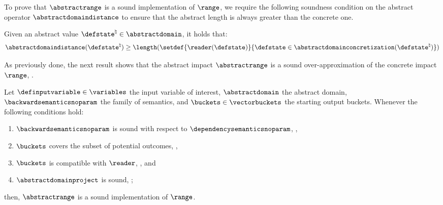 To prove that $\abstractrange$ is a sound implementation of $\range$, we require the following soundness condition on the abstract operator $\abstractdomaindistance$ to ensure that the abstract length is always greater than the concrete one.

\begin{definition}
  Given an abstract value $\defstate^\natural\in\abstractdomain$, it holds that:
  \[\abstractdomaindistance(\defstate^\natural) \ge \length(\setdef{\reader(\defstate)}{\defstate\in\abstractdomainconcretization(\defstate^\natural)})\]
\end{definition}

As previously done, the next result shows that the abstract impact $\abstractrange$ is a sound over-approximation of the concrete impact $\range$, \cf{} .

\begin{lemma}
  Let  $\definputvariable\in\variables$ the input variable of interest, $\abstractdomain$ the abstract domain, $\backwardsemanticsnoparam$ the family of semantics, and $\buckets\in\vectorbuckets$ the starting output buckets.
  Whenever the following conditions hold:
  \begin{enumerate}[label=(\roman*)]
    \item $\backwardsemanticsnoparam$ is sound with respect to $\dependencysemanticsnoparam$, \cf{} ,
    \item $\buckets$ covers the subset of potential outcomes, \cf{} ,
    \item $\buckets$ is compatible with $\reader$, \cf{} , and
    \item $\abstractdomainproject$ is sound, \cf{} ;
  \end{enumerate}
  then, $\abstractrange$ is a sound implementation of $\range$.
\end{lemma}
